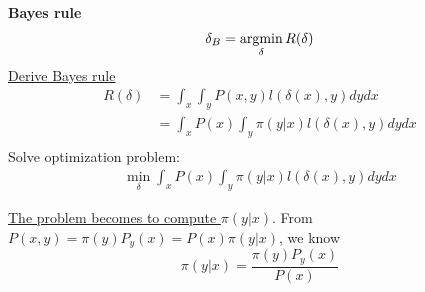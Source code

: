 \documentclass[11pt]{elegantbook}
\newcommand{\argmin}{\operatornamewithlimits{argmin}}
\begin{document}
\textbf{Bayes rule}
$$\delta_B=\argmin_\delta R(\delta)$$
\underline{Derive Bayes rule}
\begin{equation}
    \begin{aligned}
        R(\delta)&=\int_x\int_y P(x,y) l(\delta(x),y) dy dx\\
        &=\int_x P(x)\int_y \pi(y|x) l(\delta(x),y) dy dx\\
    \end{aligned}
    \nonumber
\end{equation}
Solve optimization problem:
\begin{equation}
    \begin{aligned}
        \min_\delta \int_x P(x)\int_y \pi(y|x) l(\delta(x),y) dy dx
    \end{aligned}
    \nonumber
\end{equation}
\begin{center}
\end{center}
\underline{The problem becomes to compute $\pi(y|x)$}. From $P(x,y)=\pi(y)P_y(x)=P(x)\pi(y|x)$, we know $$\pi(y|x)=\frac{\pi(y)P_y(x)}{P(x)}$$
\end{document}
